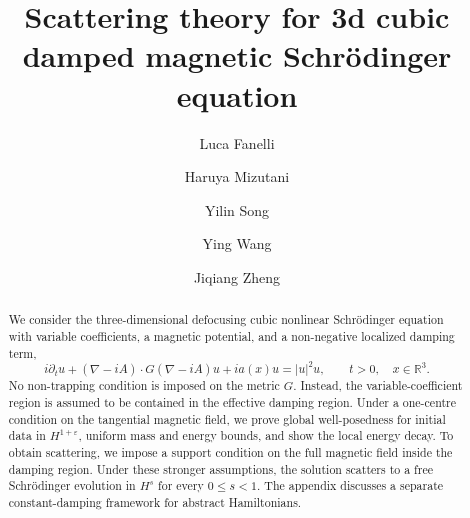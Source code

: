 \documentclass[10pt%
]{amsart}
\numberwithin{equation}{section}
\theoremstyle{definition}
\begin{document}
	\title[Defocusing damped NLS ]{Scattering theory for 3d cubic damped  magnetic Schr\"odinger equation }
	
	\author[L. Fanelli]{Luca Fanelli}
	\address{Luca Fanelli \newline
		Ikerbasque, Basque Foundation for Science; Departamento de Matem\'aticas, Euskal Herriko Unibertsitatea(EHU), 48940 Leioa, Spain; BCAM - Basque Center for Applied Mathematics, 48009 Bilbao, Spain}
	\author[H. Mizutani]{Haruya Mizutani}
	\address{Haruya Mizutani\newline
		\indent Department of Mathematics, Graduate School of Science, The University of Osaka, Toyon-
		aka, Osaka 560-0043, Japan}
	\author[Y. Song]{Yilin Song}
	\address{Yilin Song
		\newline \indent The Graduate School of China Academy of Engineering Physics,
		Beijing 100088,\ P. R. China}
	\author[Y. Wang]{Ying Wang}
	\address{Ying Wang\newline
		BCAM - Basque Center for Applied Mathematics, 48009, Bilbao, Spain}
	
	\author[J. Zheng]{Jiqiang Zheng}
	\address{Jiqiang Zheng
		\newline Institute of Applied Physics and Computational Mathematics, Beijing, 100088, China.
		\newline National Key Laboratory of Computational Physics, Beijing, 100088, China}
	
	
	
	
	\begin{abstract}
We consider the three-dimensional defocusing cubic nonlinear Schr\"odinger equation with variable coefficients, a magnetic potential, and a non-negative localized damping term,
\[
i\partial_tu+(\nabla-iA)\cdot G(\nabla-iA)u+ia(x)u=|u|^2u,
\qquad t>0,\quad x\in\mathbb R^3.
\]
No non-trapping condition is imposed on the metric $G$. Instead, the variable-coefficient region is assumed to be contained in the effective damping region. Under a one-centre condition on the tangential magnetic field, we prove global well-posedness for initial data in $H^{1+\varepsilon}$, uniform mass and energy bounds, and show the local energy decay. To obtain scattering, we impose a support condition on  the full magnetic field inside the damping region. Under these stronger assumptions, the solution scatters to a free Schr\"odinger evolution in $H^s$ for every $0\le s<1$. The appendix discusses a separate constant-damping framework for abstract Hamiltonians.
\end{abstract}
	
\end{document}
